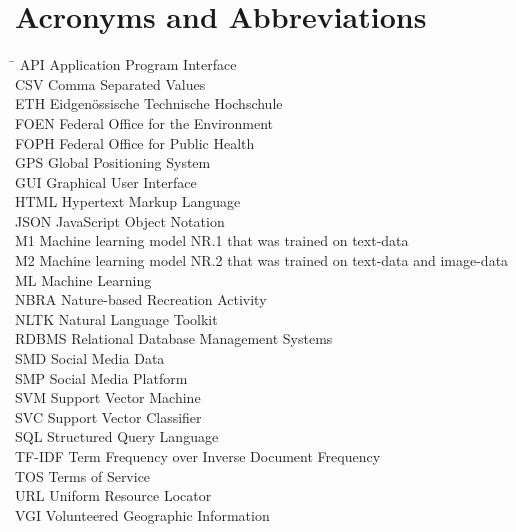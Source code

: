 
\section*{Acronyms and Abbreviations}
\begin{tabbing}
 \hspace*{1.6cm}  \= \kill
 API \> Application Program Interface \\
 CSV \> Comma Separated Values \\
 ETH \> Eidgen\"{o}ssische Technische Hochschule \\
 FOEN \> Federal Office for the Environment \\
 FOPH \> Federal Office for Public Health \\
 GPS \> Global Positioning System \\
 GUI \> Graphical User Interface \\
 HTML \> Hypertext Markup Language \\
 JSON \> JavaScript Object Notation \\
 M1 \> Machine learning model NR.1 that was trained on text-data \\
 M2 \> Machine learning model NR.2 that was trained on text-data and image-data \\
 ML \> Machine Learning \\
 NBRA \> Nature-based Recreation Activity \\%
 NLTK \> Natural Language Toolkit \\ 
 RDBMS \> Relational Database Management Systems \\
 SMD \> Social Media Data \\
 SMP \> Social Media Platform \\
 SVM \> Support Vector Machine \\
 SVC \> Support Vector Classifier \\
 SQL \> Structured Query Language \\
 TF-IDF \> Term Frequency over Inverse Document Frequency \\
 TOS \> Terms of Service \\
 URL \> Uniform Resource Locator \\ 
 VGI \> Volunteered Geographic Information
\end{tabbing}

